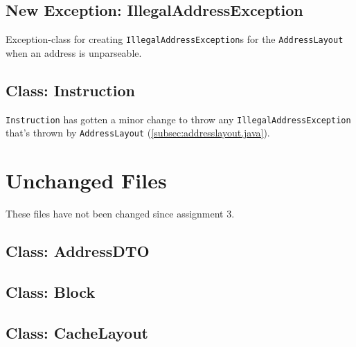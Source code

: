 \documentclass[a4paper]{scrreprt}
\begin{document}


\subsection{New Exception: IllegalAddressException}
\label{subsec:illegaladdressexception.java}

Exception-class for creating \texttt{IllegalAddressException}s for the \texttt{AddressLayout} when an address is unparseable.



\subsection{Class: Instruction}
\label{subsec:instruction.java}

\texttt{Instruction} has gotten a minor change to throw any \texttt{IllegalAddressException} that's thrown by \texttt{AddressLayout} (\ref{subsec:addresslayout.java}).



\section{Unchanged Files}
\label{sec:user}

These files have not been changed since assignment 3.

\subsection{Class: AddressDTO}
\label{subsec:addressdto.java}



\subsection{Class: Block}
\label{subsec:block.java}



\subsection{Class: CacheLayout}
\label{subsec:cachelayout.java}
\end{document}
